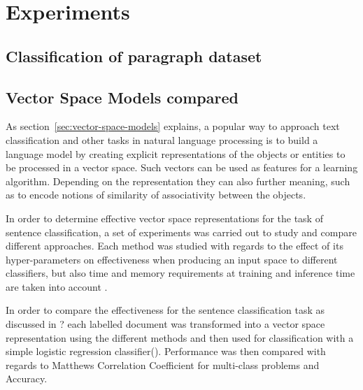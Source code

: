 
\clearpage
\section{Experiments}


\subsection{Classification of paragraph dataset}

\subsection{Vector Space Models compared}


As section~\ref{sec:vector-space-models} explains, a popular way to approach text classification and other tasks in natural language processing is to build a language model by creating explicit representations of the objects or entities to be processed in a vector space. Such vectors can be used as features for a learning algorithm. Depending on the representation they can also further meaning, such as to encode notions of similarity of associativity between the objects.

In order to determine effective vector space representations for the task of sentence classification, a set of experiments was carried out to study and compare different approaches. Each method was studied with regards to the effect of its hyper-parameters on effectiveness when producing an input space to different classifiers, but also time and memory requirements at training and inference time are taken into account .

In order to compare the effectiveness for the sentence classification task as discussed in ? each labelled document was transformed into a vector space representation using the different methods and then used for classification with a simple logistic regression classifier(). Performance was then compared with regards to Matthews Correlation Coefficient for multi-class problems  and Accuracy.

